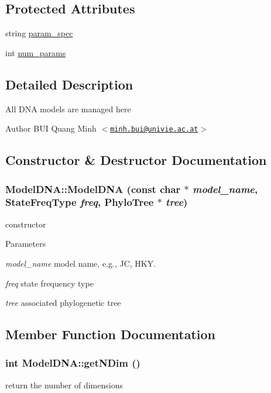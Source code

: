 \subsection*{Protected Attributes}
\begin{DoxyCompactItemize}
\item 
string \hyperlink{classModelDNA_a519992726b2a06ec784c036aef64e749}{param\_\-spec}
\item 
int \hyperlink{classModelDNA_acb20f55e922b675d5eb110907fe97ea6}{num\_\-params}
\end{DoxyCompactItemize}


\subsection{Detailed Description}
All DNA models are managed here

\begin{DoxyAuthor}{Author}
BUI Quang Minh $<$\href{mailto:minh.bui@univie.ac.at}{\tt minh.bui@univie.ac.at}$>$ 
\end{DoxyAuthor}


\subsection{Constructor \& Destructor Documentation}
\hypertarget{classModelDNA_a58ee74d1a55b85db517f65bfa865b4c6}{
\subsubsection[{ModelDNA}]{\setlength{\rightskip}{0pt plus 5cm}ModelDNA::ModelDNA (const char $\ast$ {\em model\_\-name}, \/  StateFreqType {\em freq}, \/  {\bf PhyloTree} $\ast$ {\em tree})}}
\label{classModelDNA_a58ee74d1a55b85db517f65bfa865b4c6}
constructor 
\begin{DoxyParams}{Parameters}
\item[{\em model\_\-name}]model name, e.g., JC, HKY. \item[{\em freq}]state frequency type \item[{\em tree}]associated phylogenetic tree \end{DoxyParams}


\subsection{Member Function Documentation}
\hypertarget{classModelDNA_adc73fda51fb0f02049ed891b29c3a951}{
\subsubsection[{getNDim}]{\setlength{\rightskip}{0pt plus 5cm}int ModelDNA::getNDim ()}}
\label{classModelDNA_adc73fda51fb0f02049ed891b29c3a951}
return the number of dimensions 

